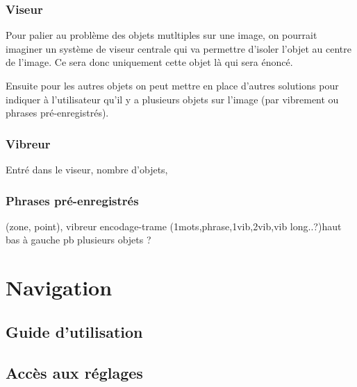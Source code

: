 \documentclass[UTF8]{EPURapport}
\begin{document}
\subsubsection{Viseur}
Pour palier au problème des objets mutltiples sur une image, on pourrait imaginer un système de viseur centrale qui va permettre d'isoler l'objet au centre de l'image. Ce sera donc uniquement cette objet là qui sera énoncé.


Ensuite pour les autres objets on peut mettre en place d'autres solutions pour indiquer à l'utilisateur qu'il y a plusieurs objets sur l'image (par vibrement ou phrases pré-enregistrés).

\subsubsection{Vibreur}
Entré dans le viseur, nombre d'objets, 
\subsubsection{Phrases pré-enregistrés}
(zone, point),
vibreur
encodage-trame (1mots,phrase,1vib,2vib,vib long..?)haut bas à gauche
pb plusieurs objets ?

\section{Navigation}
\subsection{Guide d'utilisation}
\subsection{Accès aux réglages}

\annexes
\end{document}

